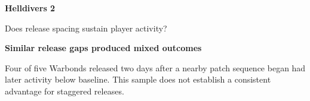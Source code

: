 \documentclass[11pt]{article}
\begin{document}
\fontsize{11}{14}\selectfont
\raggedright
{\fontsize{30}{35}\selectfont\bfseries Helldivers 2}\par
{\fontsize{20}{25}\selectfont Does release spacing sustain player activity?}\par\vspace{5pt}

\colorbox{panel}{\begin{minipage}{\dimexpr\linewidth-2\fboxsep\relax}
\vspace{7pt}\hspace{8pt}\begin{minipage}{\dimexpr\linewidth-16pt\relax}
{\fontsize{17}{21}\selectfont\bfseries Similar release gaps produced mixed outcomes}\par
Four of five Warbonds released two days after a nearby patch sequence began had later activity below baseline. This sample does not establish a consistent advantage for staggered releases.
\end{minipage}\vspace{7pt}
\end{minipage}}\par\vspace{8pt}
\end{document}
